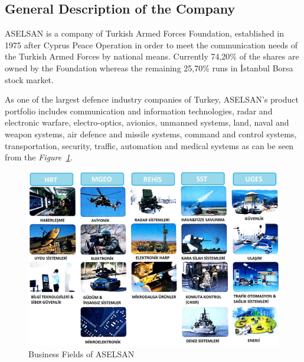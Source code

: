 \vfill

\subsection{General Description of the Company}
\-
\indent ASELSAN is a company of Turkish Armed Forces Foundation, established in 1975 after Cyprus Peace Operation in order to meet the communication needs of the Turkish Armed Forces by national means. Currently 74,20\% of the shares are owned by the Foundation whereas the remaining 25,70\% runs in İstanbul Borsa stock market.

	As one of the largest defence industry companies of Turkey, ASELSAN's product portfolio includes communication and information technologies, radar and electronic warfare, electro-optics, avionics, unmanned systems, land, naval and weapon systems, air defence and missile systems, command and control systems, transportation, security, traffic, automation and medical systems\cite{aselsan} as can be seen from the  \textit{Figure~\ref{fig:As12}}. 
	

\begin{figure}[H]
\center
\setlength{\unitlength}{\textwidth} 
\includegraphics[width=0.7\unitlength]{Aselsan1_2}
\caption{\label{fig:As12}Business Fields of ASELSAN }
\end{figure}

